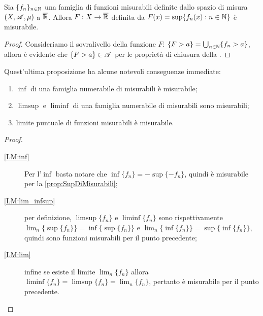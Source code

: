\begin{proposition}\label{prop:SupDiMisurabili}
	Sia $\{f_n\}_{n\in \mathbb N}$ una famiglia di funzioni misurabili definite dallo spazio di misura $(X,\mathscr A,\mu)$ a $\overline{\mathbb R}$.
	Allora $F:X\rightarrow \overline{\mathbb R}$ definita da $F(x)=\sup\{f_n(x):n\in \mathbb N\}$ è misurabile.
\end{proposition}
\begin{proof}
	Consideriamo il sovralivello della funzione $F$: $\{F>a\}=\bigcup_{n\in \mathbb N}\{f_n>a\}$, allora è evidente che $\{F>a\}\in \mathscr A$ per le proprietà 
	di chiusura della \sigalg.
\end{proof}

\begin{remark}\label{nota:LimMis}
	Quest'ultima proposizione ha alcune notevoli conseguenze immediate:
	\begin{enumerate}
		\item $\inf$ di una famiglia numerabile di misurabili è misurabile;\label{LM:inf}
		\item $\limsup$ e $\liminf$ di una famiglia numerabile di misurabili sono misurabili;\label{LM:lim_infsup}
		\item limite puntuale di funzioni misurabili è misurabile.\label{LM:lim}
	\end{enumerate}
\end{remark}
\begin{proof}
	\begin{description}
		\item[\ref{LM:inf}] Per l'$\inf$ basta notare che $\inf\{f_n\}=-\sup\{-f_n\}$, quindi è misurabile per la \cref{prop:SupDiMisurabili};
		\item[\ref{LM:lim_infsup}] per definizione, $\limsup\{f_n\}$ e $\liminf\{f_n\}$ sono rispettivamente
			$\lim_n\{\sup\{f_n\}\}=\inf\{\sup\{f_n\}\}$ e
			$\lim_n\{\inf\{f_n\}\}=\sup\{\inf\{f_n\}\}$, quindi sono funzioni misurabili per il punto precedente;
		\item[\ref{LM:lim}] infine se esiste il limite $\lim_n\{f_n\}$ allora
			$\liminf\{f_n\}=\limsup\{f_n\}=\lim_n\{f_n\}$, pertanto è misurabile per il punto precedente.
	\end{description}
\end{proof}

